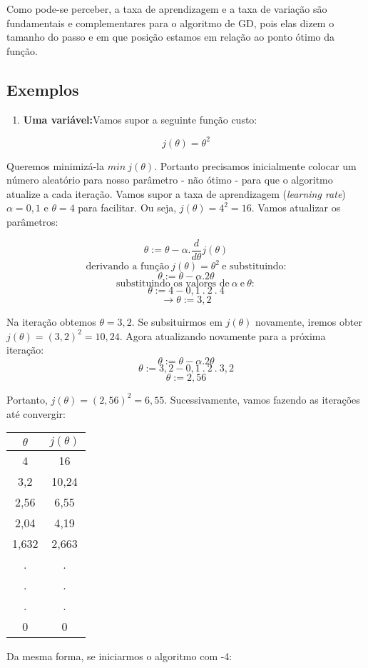 \documentclass[
  openany]{book}
\providecommand{\tightlist}{%
  \setlength{\itemsep}{0pt}\setlength{\parskip}{0pt}}
\begin{document}
Como pode-se perceber, a taxa de aprendizagem e a taxa de variação são fundamentais e complementares para o algoritmo de GD, pois elas dizem o tamanho do passo e em que posição estamos em relação ao ponto ótimo da função.

\hypertarget{exemplos}{%
\subsection{Exemplos}\label{exemplos}}

\begin{enumerate}
\def\labelenumi{\arabic{enumi}.}
\tightlist
\item
  \textbf{Uma variável:}Vamos supor a seguinte função custo:
\end{enumerate}

\[j(\theta)=\theta^2\]

Queremos minimizá-la \(min \ j(\theta)\). Portanto precisamos inicialmente colocar um número aleatório para nosso parâmetro - não ótimo - para que o algoritmo atualize a cada iteração. Vamos supor a taxa de aprendizagem (\emph{learning rate}) \(\alpha=0,1\) e \(\theta=4\) para facilitar. Ou seja, \(j(\theta)=4^2=16\). Vamos atualizar os parâmetros:

\[\theta := \theta-\alpha.\frac{d}{d\theta}j(\theta) \]
\[\mbox{derivando a função} \ j(\theta)=\theta^2 \ \mbox{e substituindo:}\]
\[\theta:= \theta -\alpha.2\theta \]
\[\mbox{substituindo os valores de}\ \alpha\ \mbox{e}\ \theta: \]
\[\theta:=4-0,1 \ .\ 2\ .\ 4 \]
\[\rightarrow \theta:=3,2\]

Na iteração obtemos \(\theta=3,2\). Se subsituirmos em \(j(\theta)\) novamente, iremos obter \(j(\theta)=(3,2)^2=10,24\). Agora atualizando novamente para a próxima iteração:
\[\theta:= \theta -\alpha.2\theta \]
\[\theta:=3,2-0,1\ .\ 2\ .\ 3,2\]
\[\theta:= 2,56\]

Portanto, \(j(\theta)=(2,56)^2=6,55\). Sucessivamente, vamos fazendo as iterações até convergir:

\begin{longtable}[]{@{}cc@{}}
\toprule
\textbf{\(\theta\)} & \textbf{\(j(\theta)\)}\tabularnewline
\midrule
\endhead
4 & 16\tabularnewline
3,2 & 10,24\tabularnewline
2,56 & 6,55\tabularnewline
2,04 & 4,19\tabularnewline
1,632 & 2,663\tabularnewline
. & .\tabularnewline
. & .\tabularnewline
. & .\tabularnewline
0 & 0\tabularnewline
\bottomrule
\end{longtable}

Da mesma forma, se iniciarmos o algoritmo com -4:
\end{document}
